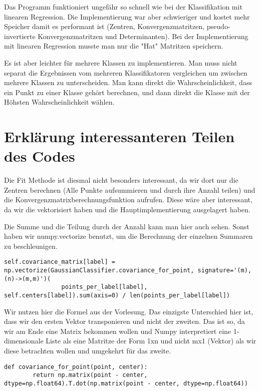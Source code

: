 Das Programm funktioniert ungefähr so schnell wie bei der Klassifikation mit linearen Regression. Die Implementierung war aber schwieriger und kostet mehr Speicher damit es performant ist (Zentren, Konvergenzmatritzen, pseudo-invertierte Konvergenzmatritzen und Determinanten). Bei der Implementierung mit linearen Regression musste man nur die "Hat" Matritzen speichern.

Es ist aber leichter für mehrere Klassen zu implementieren. Man muss nicht separat die Ergebnissen vom mehreren Klassifikatoren vergleichen um zwischen mehrere Klassen zu unterscheiden. Man kann direkt die Wahrscheinlichkeit, dass ein Punkt zu einer Klasse gehört berechnen, und dann direkt die Klasse mit der Höhsten Wahrscheinlichkeit wählen.

\section*{Erklärung interessanteren Teilen des Codes}

Die Fit Methode ist diesmal nicht besonders interessant, da wir dort nur die Zentren berechnen (Alle Punkte aufsummieren und durch ihre Anzahl teilen) und die Konvergenzmatrixberechnungsfunktion aufrufen. Diese wäre aber interessant, da wir die vektorisiert haben und die Hauptimplementierung ausgelagert haben.

Die Summe und die Teilung durch der Anzahl kann man hier auch sehen. Sonst haben wir numpy.vectorize benutzt, um die Berechnung der einzelnen Summaren zu beschleunigen.
\begin{lstlisting}[style=py]
self.covariance_matrix[label] = np.vectorize(GaussianClassifier.covariance_for_point, signature='(m),(n)->(m,m)')(
                points_per_label[label], self.centers[label]).sum(axis=0) / len(points_per_label[label])
\end{lstlisting}

Wir nutzen hier die Formel aus der Vorlesung. Das einzigste Unterschied hier ist, dass wir den ersten Vektor transponieren und nicht der zweiten.
Das ist so, da wir am Ende eine Matrix bekommen wollen und Numpy interpretiert eine 1-dimensionale Liste als eine Matritze der Form 1xn und nicht mx1 (Vektor) als wir
diese betrachten wollen und umgekehrt für das zweite.
\begin{lstlisting}[style=py]
def covariance_for_point(point, center):
        return np.matrix(point - center, dtype=np.float64).T.dot(np.matrix(point - center, dtype=np.float64))
\end{lstlisting}

